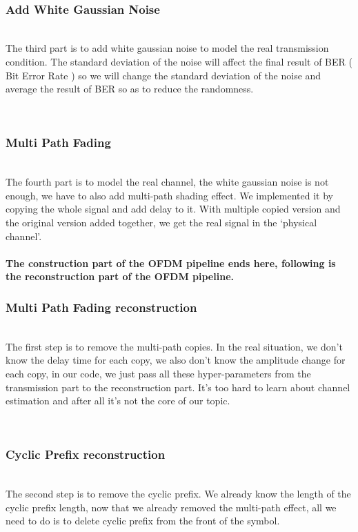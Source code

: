 \documentclass[twocolumn,conference]{IEEEtran}
\begin{document}
    \hfill\\\subsubsection{Add White Gaussian Noise}\hfill\\
    \indent The third part is to add white gaussian noise to model the real transmission condition. The standard deviation of the noise will affect the final result of BER ( Bit Error Rate ) so we will change the standard deviation of the noise and average the result of BER so as to reduce the randomness.

    \hfill\\\subsubsection{Multi Path Fading}\hfill\\
    \indent The fourth part is to model the real channel, the white gaussian noise is not enough, we have to also add multi-path shading effect. We implemented it by copying the whole signal and add delay to it. With multiple copied version and the original version added together, we get the real signal in the ‘physical channel’.
\\\\
\textbf{The construction part of the OFDM pipeline ends here, following is the reconstruction part of the OFDM pipeline.}
    \hfill\\\subsubsection{Multi Path Fading reconstruction}\hfill\\
    \indent The first step is to remove the multi-path copies. In the real situation, we don’t know the delay time for each copy, we also don’t know the amplitude change for each copy, in our code, we just pass all these hyper-parameters from the transmission part to the reconstruction part. It’s too hard to learn about channel estimation and after all it’s not the core of our topic.

    \hfill\\\subsubsection{Cyclic Prefix reconstruction}\hfill\\
     \indent The second step is to remove the cyclic prefix. We already know the length of the cyclic prefix length, now that we already removed the multi-path effect, all we need to do is to delete cyclic prefix from the front of the symbol.
\end{document}
